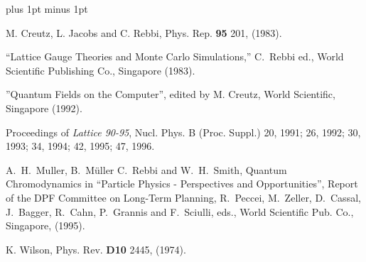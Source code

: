 \begin{thebibliography}{9}
\baselineskip 18pt plus 1pt minus 1pt

M. Creutz, L. Jacobs and C. Rebbi, Phys. Rep. {\bf 95} 201, (1983).

``Lattice Gauge 
Theories and Monte Carlo Simulations,'' C.~Rebbi ed., 
World Scientific Publishing Co., Singapore (1983).

''Quantum Fields on the Computer'',  edited by M. Creutz,
World Scientific, Singapore (1992).

Proceedings of {\it Lattice 90-95}, Nucl. Phys. B (Proc. Suppl.) 
20, 1991; 26, 1992; 30, 1993;  34, 1994; 42, 1995; 47, 1996. 

A.~H.~Muller, B.~M\"uller C.~Rebbi and W.~H.~Smith,
Quantum Chromodynamics in
``Particle Physics - Perspectives and Opportunities'', 
Report of the DPF Committee on Long-Term Planning,
R.~Peccei, M.~Zeller, D.~Cassal, J.~Bagger, R.~Cahn, P.~Grannis 
and F.~Sciulli, eds.,
World Scientific Pub. Co., Singapore, (1995). 
 
K. Wilson, Phys. Rev. {\bf D10} 2445, (1974).

\end{thebibliography}



